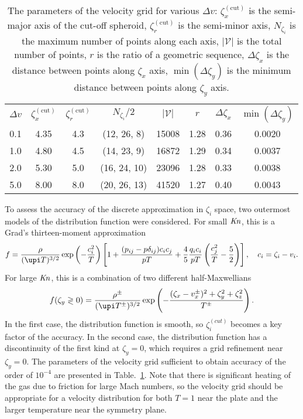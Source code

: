 \documentclass[]{jfm}
\newcommand{\Kn}{\mbox{\textit{Kn}}}
\begin{document}
\begin{table}
    \centering
    \begin{tabular}{cccccccc}
        \(\Delta{v}\) & \(\zeta^{(\mathrm{cut})}_x\) & \(\zeta^{(\mathrm{cut})}_r\)
            & \(N_{\zeta_i}/2\) & \(|\mathcal{V}|\) & \(r\) & \(\Delta\zeta_x\) & \(\min(\Delta\zeta_y)\) \\[3pt]
        0.1 & 4.35 & 4.3 & (12, 26, 8)  & 15008 & 1.28 & 0.36 & 0.0020 \\
        1.0 & 4.80 & 4.5 & (14, 23, 9)  & 16872 & 1.29 & 0.34 & 0.0037 \\
        2.0 & 5.30 & 5.0 & (16, 24, 10) & 23096 & 1.28 & 0.33 & 0.0038 \\
        5.0 & 8.00 & 8.0 & (20, 26, 13) & 41520 & 1.27 & 0.40 & 0.0043 \\
    \end{tabular}
    \caption{The parameters of the velocity grid for various \(\Delta{v}\):
        \(\zeta^{(\mathrm{cut})}_x\) is the semi-major axis of the cut-off spheroid,
        \(\zeta^{(\mathrm{cut})}_r\) is the semi-minor axis,
        \(N_{\zeta_i}\) is the maximum number of points along each axis,
        \(|\mathcal{V}|\) is the total number of points,
        \(r\) is the ratio of a geometric sequence,
        \(\Delta\zeta_x\) is the distance between points along \(\zeta_x\) axis,
        \(\min(\Delta\zeta_y)\) is the minimum distance between points along \(\zeta_y\) axis.}
    \label{table:velocity_grid}
\end{table}

To assess the accuracy of the discrete approximation in \(\zeta_i\) space,
two outermost models of the distribution function were considered.
For small \(\Kn\), this is a Grad's thirteen-moment approximation
\begin{equation}\label{eq:grad13}
    f = \frac{\rho}{(\upi T)^{3/2}}\exp\left(-\frac{c_i^2}{ T}\right)
    \left[ 1 + \frac{(p_{ij}-p\delta_{ij})c_ic_j}{pT} + \frac4{5}\frac{q_ic_i}{pT}\left(\frac{c_j^2}{T}-\frac5{2}\right) \right],
    \quad c_i = \zeta_i - v_i.
\end{equation}
For large \(\Kn\), this is a combination of two different half-Maxwellians
\begin{equation}\label{eq:double_Maxwell}
    f(\zeta_y\gtrless0) = \frac{\rho^\pm}{(\upi T^\pm)^{3/2}}\exp\left(-\frac{(\zeta_x-v_x^\pm)^2+\zeta_y^2+\zeta_z^2}{T^\pm}\right).
\end{equation}
In the first case, the distribution function is smooth,
so \(\zeta_i^{(cut)}\) becomes a key factor of the accuracy.
In the second case, the distribution function has a discontinuity of the first kind at \(\zeta_y=0\),
which requires a grid refinement near \(\zeta_y=0\).
The parameters of the velocity grid sufficient to obtain accuracy of the order of \(10^{-4}\)
are presented in Table.~\ref{table:velocity_grid}.
Note that there is significant heating of the gas due to friction for large Mach numbers,
so the velocity grid should be appropriate for a velocity distribution
for both \(T=1\) near the plate and the larger temperature near the symmetry plane.
\end{document}

